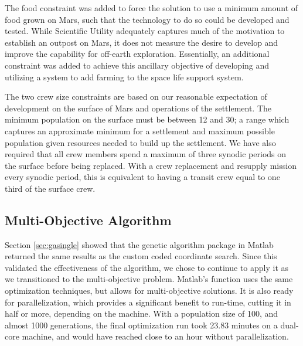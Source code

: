 \documentclass[]{aiaa-pretty}
\begin{document}
The food constraint was added to force the solution to use a minimum amount of food grown on Mars, such that the technology to do so could be developed and tested. While Scientific Utility adequately captures much of the motivation to establish an outpost on Mars, it does not measure the desire to develop and improve the capability for off-earth exploration. Essentially, an additional constraint was added to achieve this ancillary objective of developing and utilizing a system to add farming to the space life support system.

The two crew size constraints are based on our reasonable expectation of development on the surface of Mars and operations of the settlement. The minimum population on the surface must be between 12 and 30; a range which captures an approximate minimum for a settlement and maximum possible population given resources needed to build up the settlement. We have also required that all crew members spend a maximum of three synodic periods on the surface before being replaced. With a crew replacement and resupply mission every synodic period, this is equivalent to having a transit crew equal to one third of the surface crew.

\subsection{Multi-Objective Algorithm}
Section \ref{sec:gasingle} showed that the genetic algorithm package in Matlab returned the same results as the custom coded coordinate search.  Since this validated the effectiveness of the  algorithm, we chose to continue to apply it as we transitioned to the multi-objective problem.  Matlab's  function uses the same optimization techniques, but allows for multi-objective solutions.  It is also ready for parallelization, which provides a significant benefit to run-time, cutting it in half or more, depending on the machine. With a population size of 100, and almost 1000 generations, the final optimization run took 23.83 minutes on a dual-core machine, and would have reached close to an hour without parallelization.
\end{document}
